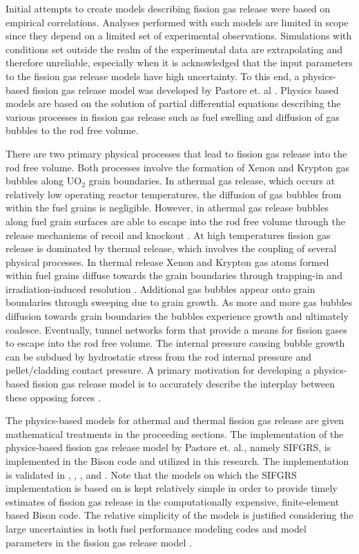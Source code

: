 Initial attempts to create models describing fission gas release were based on empirical correlations. Analyses performed with such models are limited in scope since they depend on a limited set of experimental observations. Simulations with conditions set outside the realm of the experimental data are extrapolating and therefore unreliable, especially when it is acknowledged that the input parameters to the fission gas release models have high uncertainty. To this end, a physics-based fission gas release model was developed by Pastore et. al \cite{Pastore3}. Physics based models are based on the solution of partial differential equations describing the various processes in fission gas release such as fuel swelling and diffusion of gas bubbles to the rod free volume. 

There are two primary physical processes that lead to fission gas release into the rod free volume. Both processes involve the formation of Xenon and Krypton gas bubbles along UO$_2$ grain boundaries. In athermal gas release, which occurs at relatively low operating reactor temperatures, the diffusion of gas bubbles from within the fuel grains is negligible. However, in athermal gas release bubbles along fuel grain surfaces are able to escape into the rod free volume through the release mechanisms of recoil and knockout \cite{Pastore1}. At high temperatures fission gas release is dominated by thermal release, which involves the coupling of several physical processes. In thermal release Xenon and Krypton gas atoms formed within fuel grains diffuse towards the grain boundaries through trapping-in and irradiation-induced resolution \cite{Pastore3}. Additional gas bubbles appear onto grain boundaries through sweeping due to grain growth. As more and more gas bubbles diffusion towards grain boundaries the bubbles experience growth and ultimately coalesce. Eventually, tunnel networks form that provide a means for fission gases to escape into the rod free volume. The internal pressure causing bubble growth can be subdued by hydrostatic stress from the rod internal pressure and pellet/cladding contact pressure. A primary motivation for developing a physics-based fission gas release model is to accurately describe the interplay between these opposing forces \cite{Pastore3}.    

The physics-based models for athermal and thermal fission gas release are given mathematical treatments in the proceeding sections. The implementation of the physics-based fission gas release model by Pastore et. al., namely \ac{SIFGRS}, is implemented in the Bison code and utilized in this research. The implementation is validated in \cite{Pastore1}, \cite{Pastore2}, \cite{Perez}, and \cite{Pastore}. Note that the models on which the \ac{SIFGRS} implementation is based on is kept relatively simple in order to provide timely estimates of fission gas release in the computationally expensive, finite-element based Bison code. The relative simplicity of the models is justified considering the large uncertainties in both fuel performance modeling codes and model parameters in the fission gas release model \cite{Pastore2} \cite{Lassmann}. 

